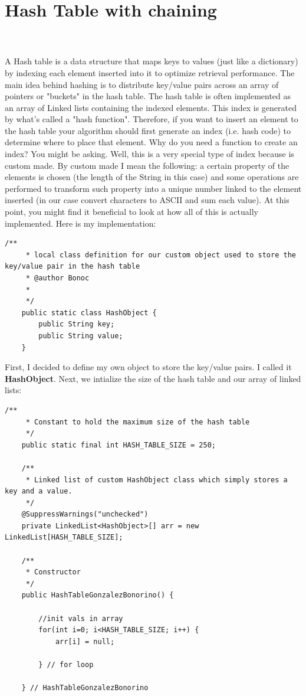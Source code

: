 \documentclass[letterpaper, 10pt]{article}
\begin{document}
\pagebreak
\section{Hash Table with chaining}
\\
\\
A Hash table is a data structure that maps keys to values (just like a dictionary) by indexing each element inserted into it to optimize retrieval performance. The main idea behind hashing is to distribute key/value pairs across an array of pointers or "buckets" in the hash table. The hash table is often implemented as an array of Linked lists containing the indexed elements. This index is generated by what's called a "hash function". Therefore, if you want to insert an element to the hash table your algorithm should first generate an index (i.e. hash code) to determine where to place that element. Why do you need a function to create an index? You might be asking. Well, this is a very special type of index because is custom made. By custom made I mean the following: a certain property of the elements is chosen (the length of the String in this case) and some operations are performed to transform such property into a unique number linked to the element inserted (in our case convert characters to ASCII and sum each value). At this point, you might find it beneficial to look at how all of this is actually implemented. Here is my implementation:
\begin{lstlisting}
/**
	 * local class definition for our custom object used to store the key/value pair in the hash table
	 * @author Bonoc
	 *
	 */
    public static class HashObject {
        public String key;
        public String value;
    }
\end{lstlisting}
First, I decided to define my own object to store the key/value pairs. I called it \textbf{HashObject}. Next, we intialize the size of the hash table and our array of linked lists:
\begin{lstlisting}
/**
     * Constant to hold the maximum size of the hash table
     */
    public static final int HASH_TABLE_SIZE = 250;

    /**
     * Linked list of custom HashObject class which simply stores a key and a value.
     */
    @SuppressWarnings("unchecked")
	private LinkedList<HashObject>[] arr = new LinkedList[HASH_TABLE_SIZE];

    /**
     * Constructor
     */
    public HashTableGonzalezBonorino() {
    	
        //init vals in array
        for(int i=0; i<HASH_TABLE_SIZE; i++) {
            arr[i] = null;
            
        } // for loop
        
    } // HashTableGonzalezBonorino
\end{lstlisting}
\end{document}
